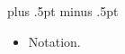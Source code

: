 \pagestyle{plain}
\baselineskip=12pt plus .5pt minus .5pt

\begin{itemize}
  \item Notation.
\end{itemize}
